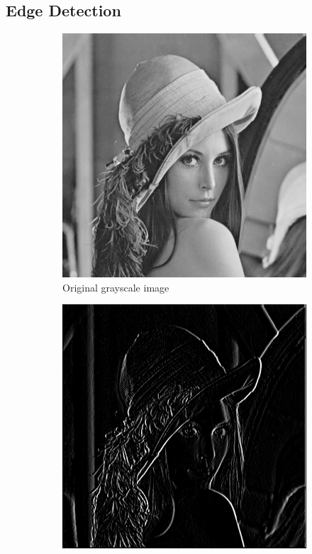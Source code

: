 \documentclass[a4paper,16pt]{article}
\begin{document}
	\subsection{Edge Detection}
	\vspace{0.2in}
	
	\vspace{0.4in}
	\begin{figure}[h!]
		\begin{subfigure}[h!]{0.45\linewidth}
			\includegraphics[width=\linewidth]{grayscale}
			\caption{Original grayscale image}
		\end{subfigure}
		\hfill
		\begin{subfigure}[h!]{0.45\linewidth}
			\includegraphics[width=\linewidth]{horizontal}

\end{subfigure}
\end{figure}
\end{document}
